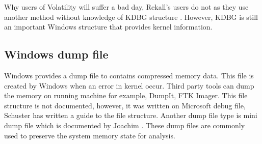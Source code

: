 Why users of Volatility will suffer a bad day, Rekall's users do not as they use another method without knowledge of KDBG structure \cite{rekallOnKDBGEncoding}. However, KDBG is still an important Windows structure that provides kernel information.

\subsection[Windows dump file]{Windows dump file}

Windows provides a dump file to contains compressed memory data. This file is created by Windows when an error in kernel occur. Third party tools can dump the memory on running machine for example, DumpIt, FTK Imager. This file structure is not documented, however, it was written on Microsoft debug file, Schuster \cite{dmpfile} has written a guide to the file structure. Another dump file type is mini dump file which is documented by Joachim \cite{mdmpfile}. These dump files are commonly used to preserve the system memory state for analysis.

